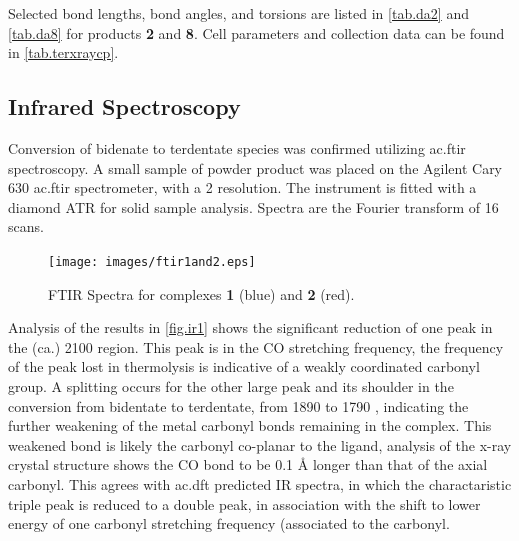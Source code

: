 Selected bond lengths, bond angles, and torsions are listed in \autoref{tab.da2} and \autoref{tab.da8} for products \textbf{2} and \textbf{8}. Cell parameters and collection data can be found in \autoref{tab.terxraycp}. 





\FloatBarrier

\subsection{Infrared Spectroscopy}

Conversion of bidenate to terdentate species was confirmed utilizing \gls{ac.ftir} spectroscopy. A small sample of powder product was placed on the Agilent Cary 630 \gls{ac.ftir} spectrometer, with a 2  resolution. The instrument is fitted with a diamond ATR for solid sample analysis. Spectra are the Fourier transform of 16 scans.

\begin{figure}[!htb]
 \begin{center}
  \texttt{[image: images/ftir1and2.eps]}
 \end{center}
\caption[FTIR Spectra for complexes \textbf{1} and \textbf{2}]{FTIR Spectra for complexes \textbf{1} (blue) and \textbf{2} (red).}
\label{fig.ir1}
\end{figure} 

Analysis of the results in \autoref{fig.ir1} shows the significant reduction of one peak in the (ca.) 2100  region. This peak is in the CO stretching frequency, the frequency of the peak lost in thermolysis is indicative of a weakly coordinated carbonyl group. A splitting occurs for the other large peak and its shoulder in the conversion from bidentate to terdentate, from 1890 to 1790 , indicating the further weakening of the metal carbonyl bonds remaining in the complex. This weakened bond is likely the carbonyl co-planar to the ligand, analysis of the x-ray crystal structure shows the CO bond to be 0.1 \r{A} longer than that of the axial carbonyl. This agrees with \gls{ac.dft} predicted IR spectra, in which the charactaristic triple peak is reduced to a double peak, in association with the shift to lower energy of one carbonyl stretching frequency (associated to the  carbonyl.

